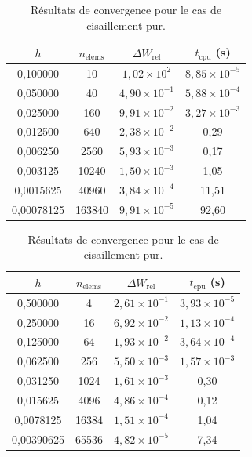 \documentclass[a4paper,11pt]{article}
\begin{document}
\begin{table}[H]
\centering

\begin{minipage}{0.48\textwidth}
    \centering
    \footnotesize
    \begin{tabular}{|c|c|c|c|}
        \hline
        $h$ & $n_{\text{elems}}$ & $\Delta W_{\text{rel}}$ & $t_{\text{cpu}}$ (s) \\
        \hline
        0,100000 & 10 & $1,02\times10^{2}$ & $8,85\times10^{-5}$ \\
        0,050000 & 40 & $4,90\times10^{-1}$ & $5,88\times10^{-4}$ \\
        0,025000 & 160 & $9,91\times10^{-2}$ & $3,27\times10^{-3}$ \\
        0,012500 & 640 & $2,38\times10^{-2}$ & 0,29 \\
        0,006250 & 2560 & $5,93\times10^{-3}$ & 0,17 \\
        0,003125 & 10240 & $1,50\times10^{-3}$ & 1,05 \\
        0,0015625 & 40960 & $3,84\times10^{-4}$ & 11,51 \\
        0,00078125 & 163840 & $9,91\times10^{-5}$ & 92,60 \\
        \hline
    \end{tabular}
    \caption{Résultats de convergence pour le cas de flexion.}
    \label{tab:validation_flexion}
\end{minipage}
\hfill
\begin{minipage}{0.48\textwidth}
    \centering
    \footnotesize
    \begin{tabular}{|c|c|c|c|}
        \hline
        $h$ & $n_{\text{elems}}$ & $\Delta W_{\text{rel}}$ & $t_{\text{cpu}}$ (s) \\
        \hline
        0,500000 & 4 & $2,61\times10^{-1}$ & $3,93\times10^{-5}$ \\
        0,250000 & 16 & $6,92\times10^{-2}$ & $1,13\times10^{-4}$ \\
        0,125000 & 64 & $1,93\times10^{-2}$ & $3,64\times10^{-4}$ \\
        0,062500 & 256 & $5,50\times10^{-3}$ & $1,57\times10^{-3}$ \\
        0,031250 & 1024 & $1,61\times10^{-3}$ & 0,30 \\
        0,015625 & 4096 & $4,86\times10^{-4}$ & 0,12 \\
        0,0078125 & 16384 & $1,51\times10^{-4}$ & 1,04 \\
        0,00390625 & 65536 & $4,82\times10^{-5}$ & 7,34 \\
        \hline
    \end{tabular}
    \caption{Résultats de convergence pour le cas de cisaillement pur.}
    \label{tab:validation_shear}
\end{minipage}

\end{table}
\end{document}
